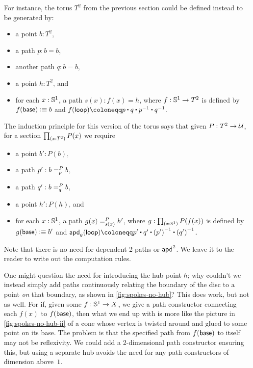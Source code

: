 For instance, the torus $T^2$ from the previous section could be defined instead to be generated by:
\begin{itemize}
\item a point $b:T^2$,
\item a path $p:b=b$,
\item another path $q:b=b$,
\item a point $h:T^2$, and
\item for each $x:\Sn^1$, a path $s(x) : f(x)=h$, where $f:\Sn^1\to T^2$ is defined by $f(\base)\defeq b$ and $\ap f \lloop \defid p \ct q \ct \opp p \ct \opp q$.
\end{itemize}
The induction principle for this version of the torus says that given $P:T^2\to\type$, for a section $\prd{x:T^2} P(x)$ we require
\begin{itemize}
\item a point $b':P(b)$,
\item a path $p' : \dpath P p b b$,
\item a path $q' : \dpath P q b b$,
\item a point $h':P(h)$, and
\item for each $x:\Sn^1$, a path $\dpath {P}{s(x)}{g(x)}{h'}$, where $g:\prd{x:\Sn^1} P(f(x))$ is defined by $g(\base)\defeq b'$ and $\apd g \lloop \defid p' \ct q' \ct \opp{(p')} \ct \opp{(q')}$.
\end{itemize}
Note that there is no need for dependent 2-paths or $\apdtwofunc{}$.
We leave it to the reader to write out the computation rules.

\begin{rmk}\label{rmk:spokes-no-hub}
One might question the need for introducing the hub point $h$; why couldn't we instead simply add paths continuously relating the boundary of the disc to a point \emph{on} that boundary, as shown in \autoref{fig:spokes-no-hub}?
This does work, but not as well.
For if, given some $f:\Sn^1 \to X$, we give a path constructor connecting each $f(x)$ to $f(\base)$, then what we end up with is more like the picture in \autoref{fig:spokes-no-hub-ii} of a cone whose vertex is twisted around and glued to some point on its base.
The problem is that the specified path from $f(\base)$ to itself may not be reflexivity.
We could add a 2-dimensional path constructor ensuring this, but using a separate hub avoids the need for any path constructors of dimension above~$1$.
\end{rmk}

